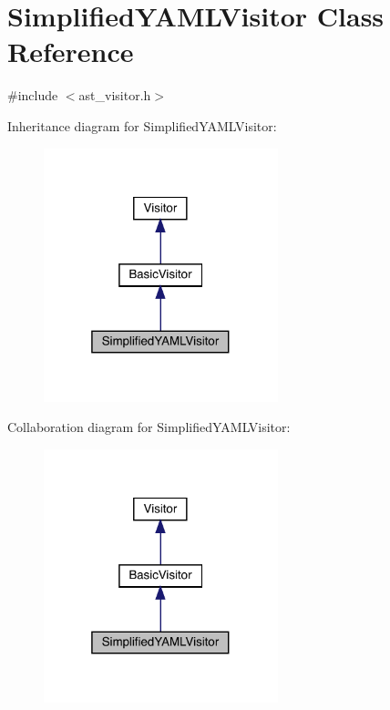 \hypertarget{class_simplified_y_a_m_l_visitor}{}\section{Simplified\+Y\+A\+M\+L\+Visitor Class Reference}
\label{class_simplified_y_a_m_l_visitor}


{\ttfamily \#include $<$ast\+\_\+visitor.\+h$>$}



Inheritance diagram for Simplified\+Y\+A\+M\+L\+Visitor\+:\nopagebreak
\begin{figure}[H]
\begin{center}
\leavevmode
\includegraphics[width=193pt]{class_simplified_y_a_m_l_visitor__inherit__graph}
\end{center}
\end{figure}


Collaboration diagram for Simplified\+Y\+A\+M\+L\+Visitor\+:\nopagebreak
\begin{figure}[H]
\begin{center}
\leavevmode
\includegraphics[width=193pt]{class_simplified_y_a_m_l_visitor__coll__graph}
\end{center}
\end{figure}
